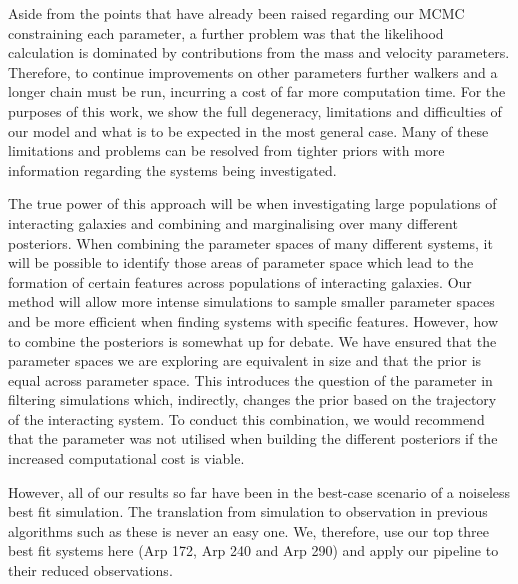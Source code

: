 Aside from the points that have already been raised regarding our MCMC constraining each parameter, a further problem was that the likelihood calculation is dominated by contributions from the mass and velocity parameters. Therefore, to continue improvements on other parameters further walkers and a longer chain must be run, incurring a cost of far more computation time. For the purposes of this work, we show the full degeneracy, limitations and difficulties of our model and what is to be expected in the most general case. Many of these limitations and problems can be resolved from tighter priors with more information regarding the systems being investigated.

The true power of this approach will be when investigating large populations of interacting galaxies and combining and marginalising over many different posteriors. When combining the parameter spaces of many different systems, it will be possible to identify those areas of parameter space which lead to the formation of certain features across populations of interacting galaxies. Our method will allow more intense simulations to sample smaller parameter spaces and be more efficient when finding systems with specific features. However, how to combine the posteriors is somewhat up for debate. We have ensured that the parameter spaces we are exploring are equivalent in size and that the prior is equal across parameter space. This introduces the question of the \DIFdelbegin \DIFdel{$\beta$ }\DIFdelend \DIFaddbegin \DIFadd{$\gamma$ }\DIFaddend parameter in filtering simulations which, indirectly, changes the prior based on the trajectory of the interacting system. To conduct this combination, we would recommend that the \DIFdelbegin \DIFdel{$\beta$ }\DIFdelend \DIFaddbegin \DIFadd{$\gamma$ }\DIFaddend parameter was not utilised when building the different posteriors if the increased computational cost is viable.

However, all of our results so far have been in the best-case scenario of a noiseless best fit simulation. The translation from simulation to observation in previous algorithms such as these is never an easy one. We, therefore, use our top three best fit systems here (Arp 172, Arp 240 and Arp 290) and apply our pipeline to their reduced observations.

